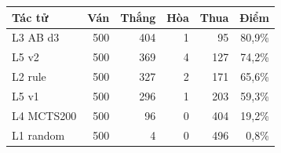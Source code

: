 \begin{center}\small
\begin{tabular}{@{}lrrrrr@{}}
\toprule
Tác tử & Ván & Thắng & Hòa & Thua & Điểm \\
\midrule
L3 AB d3 & 500 & 404 & 1 & 95 & 80,9\% \\
L5 v2 & 500 & 369 & 4 & 127 & 74,2\% \\
L2 rule & 500 & 327 & 2 & 171 & 65,6\% \\
L5 v1 & 500 & 296 & 1 & 203 & 59,3\% \\
L4 MCTS200 & 500 & 96 & 0 & 404 & 19,2\% \\
L1 random & 500 & 4 & 0 & 496 & 0,8\% \\
\bottomrule
\end{tabular}
\end{center}
